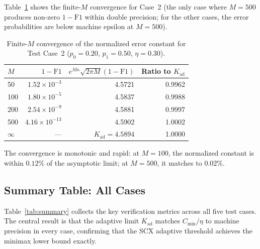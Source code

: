 \documentclass[article]{amsart}
\theoremstyle{definition}
\begin{document}
Table~\ref{tab:finiteM} shows the finite-$M$ convergence for Case~2 (the only case where $M=500$ produces non-zero $1-\mathrm{F1}$ within double precision; for the other cases, the error probabilities are below machine epsilon at $M=500$).

\begin{table}[htbp]
\centering
\caption{Finite-$M$ convergence of the normalized error constant for Test Case~2 ($p_0=0.20$, $p_1=0.50$, $\eta=0.30$).}
\label{tab:finiteM}
\begin{tabular}{lrrr}
\toprule
$M$ & $1 - \mathrm{F1}$ & $e^{M\kappa}\sqrt{2\pi M}(1-\mathrm{F1})$ & Ratio to $K_{\mathrm{ad}}$ \\
\midrule
50 & $1.52 \times 10^{-3}$ & 4.5721 & 0.9962 \\
100 & $1.80 \times 10^{-5}$ & 4.5837 & 0.9988 \\
200 & $2.54 \times 10^{-9}$ & 4.5881 & 0.9997 \\
500 & $4.16 \times 10^{-13}$ & 4.5902 & 1.0002 \\
$\infty$ & --- & $K_{\mathrm{ad}} = 4.5894$ & 1.0000 \\
\bottomrule
\end{tabular}
\end{table}

The convergence is monotonic and rapid: at $M=100$, the normalized constant is within $0.12\%$ of the asymptotic limit; at $M=500$, it matches to $0.02\%$.

\subsection{Summary Table: All Cases}

Table~\ref{tab:summary} collects the key verification metrics across all five test cases. The central result is that the adaptive limit $K_{\mathrm{ad}}$ matches $C_{\min}/\eta$ to machine precision in every case, confirming that the SCX adaptive threshold achieves the minimax lower bound exactly.
\end{document}
